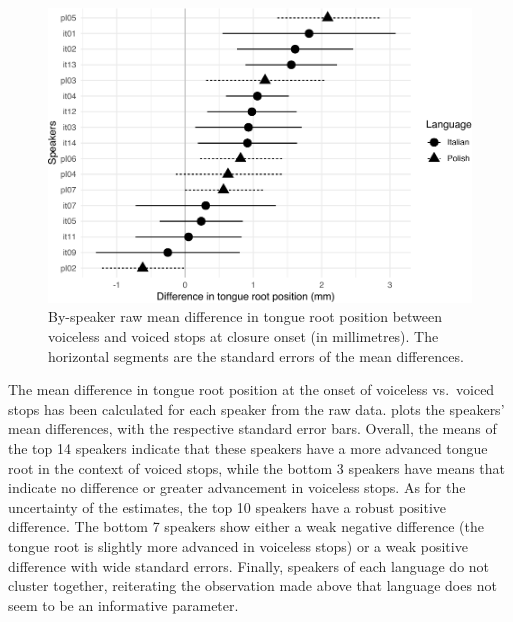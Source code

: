 \documentclass[preprint]{JASAnew}
\begin{document}
\begin{figure}
\includegraphics[width=\linewidth]{./Figure8} \caption{By-speaker raw mean difference in tongue root position between voiceless and voiced stops at closure onset (in millimetres). The horizontal segments are the standard errors of the mean differences.}\label{f:Figure8}
\end{figure}

The mean difference in tongue root position at the onset of voiceless
vs.~voiced stops has been calculated for each speaker from the raw data.
 plots the speakers' mean differences, with the
respective standard error bars. Overall, the means of the top 14
speakers indicate that these speakers have a more advanced tongue root
in the context of voiced stops, while the bottom 3 speakers have means
that indicate no difference or greater advancement in voiceless stops.
As for the uncertainty of the estimates, the top 10 speakers have a
robust positive difference. The bottom 7 speakers show either a weak
negative difference (the tongue root is slightly more advanced in
voiceless stops) or a weak positive difference with wide standard
errors. Finally, speakers of each language do not cluster together,
reiterating the observation made above that language does not seem to be
an informative parameter.
\end{document}
